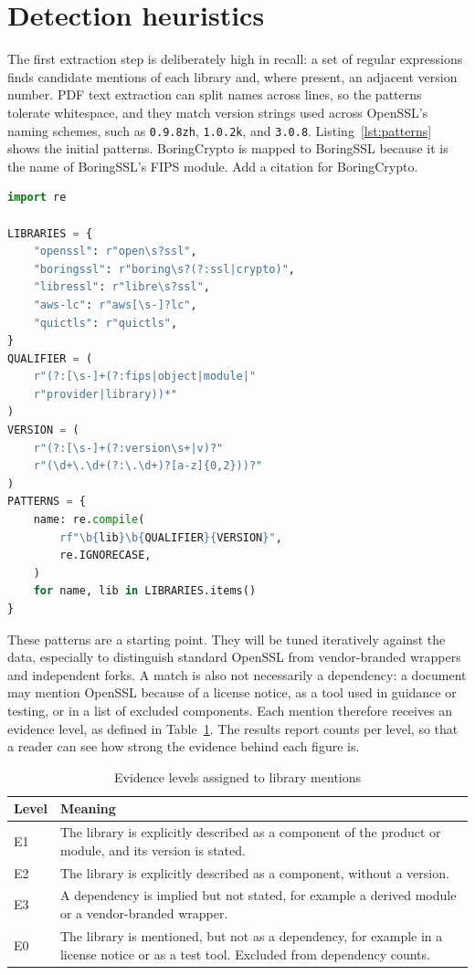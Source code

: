 \section{Detection heuristics}
\label{sec:heuristics}

The first extraction step is deliberately high in recall: a set of regular
expressions finds candidate mentions of each library and, where present, an
adjacent version number. PDF text extraction can split names across lines, so the
patterns tolerate whitespace, and they match version strings used across
OpenSSL's naming schemes, such as \texttt{0.9.8zh}, \texttt{1.0.2k}, and
\texttt{3.0.8}. Listing~\ref{lst:patterns} shows the initial patterns. BoringCrypto
is mapped to BoringSSL because it is the name of BoringSSL's FIPS module.
{Add a citation for BoringCrypto.}

\begin{lstlisting}[language=Python, caption={Initial library detection patterns},
  label={lst:patterns}]
import re

LIBRARIES = {
    "openssl": r"open\s?ssl",
    "boringssl": r"boring\s?(?:ssl|crypto)",
    "libressl": r"libre\s?ssl",
    "aws-lc": r"aws[\s-]?lc",
    "quictls": r"quictls",
}
QUALIFIER = (
    r"(?:[\s-]+(?:fips|object|module|"
    r"provider|library))*"
)
VERSION = (
    r"(?:[\s-]+(?:version\s+|v)?"
    r"(\d+\.\d+(?:\.\d+)?[a-z]{0,2}))?"
)
PATTERNS = {
    name: re.compile(
        rf"\b{lib}\b{QUALIFIER}{VERSION}",
        re.IGNORECASE,
    )
    for name, lib in LIBRARIES.items()
}
\end{lstlisting}

These patterns are a starting point. They will be tuned iteratively against the
data, especially to distinguish standard OpenSSL from vendor-branded wrappers and
independent forks. A match is also not necessarily a dependency: a document may
mention OpenSSL because of a license notice, as a tool used in guidance or
testing, or in a list of excluded components. Each mention therefore receives
an evidence level, as defined in Table~\ref{tab:evidence}. The results report
counts per level, so that a reader can see how strong the evidence behind each
figure is.

\begin{table}[htbp]
  \centering
  \caption{Evidence levels assigned to library mentions}
  \label{tab:evidence}
  \begin{tabular}{lp{}}
    \toprule
    Level & Meaning \\
    \midrule
    E1 & The library is explicitly described as a component of the product
      or module, and its version is stated. \\
    E2 & The library is explicitly described as a component, without a version. \\
    E3 & A dependency is implied but not stated, for example a derived module or a
      vendor-branded wrapper. \\
    E0 & The library is mentioned, but not as a dependency, for example in a
      license notice or as a test tool. Excluded from dependency counts. \\
    \bottomrule
  \end{tabular}
\end{table}


